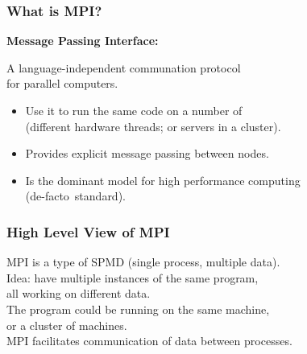 \documentclass[aspectratio=43]{beamer}
\newenvironment{changemargin}[1]{%
  \begin{list}{}{%
    \setlength{\topsep}{0pt}%
    \setlength{\leftmargin}{#1}%
    \setlength{\rightmargin}{1em}
    \setlength{\listparindent}{\parindent}%
    \setlength{\itemindent}{\parindent}%
    \setlength{\parsep}{\parskip}%
  }%
  \item[]}{\end{list}}
\begin{document}
\begin{frame}
  \frametitle{What is MPI?}

  \begin{changemargin}{1.5cm}

  {\bf Message Passing Interface:}

  A language-independent communation protocol\\ for parallel computers.

  \begin{itemize}
    \item Use it to run the same code on a number of \\ \qquad (different hardware
      threads; or servers in a cluster).
    \item Provides explicit message passing between nodes.
    \item Is the dominant model for high performance computing\\ \qquad (de-facto~standard).
  \end{itemize}
  \end{changemargin}
\end{frame}

\begin{frame}
  \frametitle{High Level View of MPI}

  \begin{changemargin}{2cm}

    MPI is a type of SPMD (single process, multiple data).\\[2em]

    Idea: have multiple instances of the same program, \\ all working on
      different data.\\[0.5em]

    The program could be running on the same machine, \\ or a cluster of machines.\\[0.5em]

    MPI facilitates communication of data between processes.
  \end{changemargin}
\end{frame}
\end{document}
